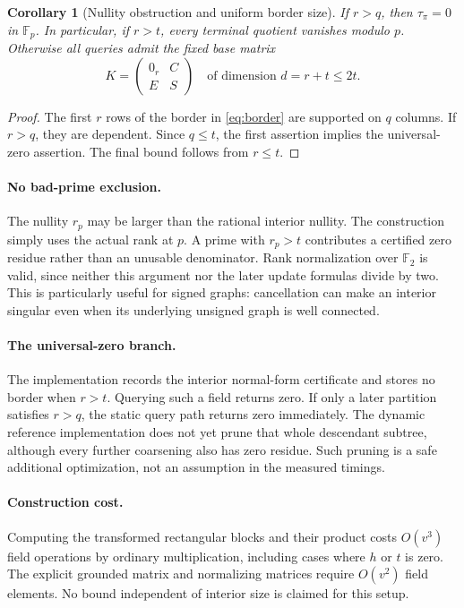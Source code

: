 \documentclass[11pt,letterpaper]{article}
\newtheorem{corollary}[theorem]{Corollary}
\theoremstyle{definition}\newtheorem{definition}[theorem]{Definition}
\theoremstyle{remark}\newtheorem{remark}[theorem]{Remark}
\newcommand{\F}{\mathbb F}
\begin{document}
\begin{corollary}[Nullity obstruction and uniform border size]
\label{cor:nullity}
If $r>q$, then $\tau_\pi=0$ in $\F_p$. In particular, if $r>t$, every terminal quotient vanishes modulo $p$. Otherwise all queries admit the fixed base matrix
\begin{equation}
 K=\begin{pmatrix}0_r&C\\E&S\end{pmatrix}
 \quad\text{of dimension }d=r+t\leq2t.
 \label{eq:base}
\end{equation}
\end{corollary}
\begin{proof}
The first $r$ rows of the border in \eqref{eq:border} are supported on $q$ columns. If $r>q$, they are dependent. Since $q\leq t$, the first assertion implies the universal-zero assertion. The final bound follows from $r\leq t$.
\end{proof}

\paragraph{No bad-prime exclusion.}
The nullity $r_p$ may be larger than the rational interior nullity. The construction simply uses the actual rank at $p$. A prime with $r_p>t$ contributes a certified zero residue rather than an unusable denominator. Rank normalization over $\F_2$ is valid, since neither this argument nor the later update formulas divide by two. This is particularly useful for signed graphs: cancellation can make an interior singular even when its underlying unsigned graph is well connected.

\paragraph{The universal-zero branch.}
The implementation records the interior normal-form certificate and stores no border when $r>t$. Querying such a field returns zero. If only a later partition satisfies $r>q$, the static query path returns zero immediately. The dynamic reference implementation does not yet prune that whole descendant subtree, although every further coarsening also has zero residue. Such pruning is a safe additional optimization, not an assumption in the measured timings.

\paragraph{Construction cost.}
Computing the transformed rectangular blocks and their product costs $O(v^3)$ field operations by ordinary multiplication, including cases where $h$ or $t$ is zero. The explicit grounded matrix and normalizing matrices require $O(v^2)$ field elements. No bound independent of interior size is claimed for this setup.
\end{document}
